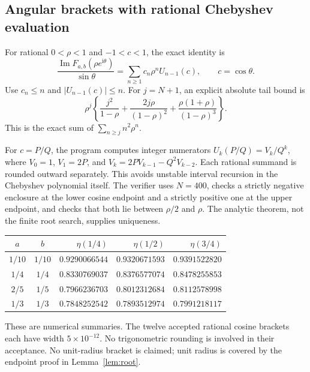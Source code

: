 \documentclass[11pt]{article}
\numberwithin{equation}{section}
\theoremstyle{definition}
\theoremstyle{remark}
\DeclareMathOperator{\Impart}{Im}
\newcommand{\ii}{\mathrm i}
\begin{document}
\subsection{Angular brackets with rational Chebyshev evaluation}
For rational $0<\rho<1$ and $-1<c<1$, the exact identity is
\begin{equation}\label{eq:chebyshev}
 \frac{\Impart F_{a,b}(\rho e^{\ii\theta})}{\sin\theta}
 =\sum_{n\ge1}c_n\rho^nU_{n-1}(c),\qquad c=\cos\theta.
\end{equation}
Use $c_n\le n$ and $|U_{n-1}(c)|\le n$. For $j=N+1$, an explicit
absolute tail bound is
\begin{equation}\label{eq:angulartail}
 \rho^j\left\{\frac{j^2}{1-\rho}
       +\frac{2j\rho}{(1-\rho)^2}
       +\frac{\rho(1+\rho)}{(1-\rho)^3}\right\}.
\end{equation}
This is the exact sum of $\sum_{n\ge j}n^2\rho^n$.

For $c=P/Q$, the program computes integer numerators
$U_k(P/Q)=V_k/Q^k$, where
$V_0=1$, $V_1=2P$, and $V_k=2PV_{k-1}-Q^2V_{k-2}$.
Each rational summand is rounded outward separately. This avoids
unstable interval recursion in the Chebyshev polynomial itself.
The verifier uses $N=400$, checks a strictly negative enclosure at
the lower cosine endpoint and a strictly positive one at the upper
endpoint, and checks that both lie between $\rho/2$ and $\rho$.
The analytic theorem, not the finite root search, supplies uniqueness.

\begin{center}
\small
\begin{tabular}{@{}c c r r r@{}}
\toprule
$a$ & $b$ & $\eta(1/4)$ & $\eta(1/2)$ & $\eta(3/4)$\\
\midrule
$1/10$ & $1/10$ & $0.9290066544$ & $0.9320671593$ & $0.9391522820$\\
$1/4$ & $1/4$ & $0.8330769037$ & $0.8376577074$ & $0.8478255853$\\
$2/5$ & $1/5$ & $0.7966236703$ & $0.8012312684$ & $0.8112578998$\\
$1/3$ & $1/3$ & $0.7848252542$ & $0.7893512974$ & $0.7991218117$\\
\bottomrule
\end{tabular}
\end{center}
These are numerical summaries. The twelve accepted rational cosine
brackets each have width $5\times10^{-12}$. No trigonometric rounding
is involved in their acceptance. No unit-radius bracket is claimed;
unit radius is covered by the endpoint proof in Lemma~\ref{lem:root}.
\end{document}
